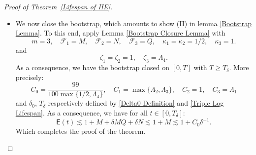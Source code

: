 \documentclass[10pt,a4paper]{amsart}
\begin{document}
\begin{proof}[Proof of Theorem~\ref{Lifespan of IIE}]
\begin{itemize}
\item [(III)] We now close the bootstrap, which amounts to show (II) in lemma \ref{Bootstrap Lemma}. To this end, apply Lemma \ref{Bootstrap Closure Lemma} with
\begin{equation*}
  m=3,\quad\mathcal F_1=M,\quad \mathcal F_2=N,\quad \mathcal F_3=Q,\quad \kappa_1=\kappa_2=1/2,\quad \kappa_3=1.  
\end{equation*}
and
\begin{equation*}
 \zeta_1=\zeta_2=1,\quad \zeta_3=   \Lambda_4.
\end{equation*}
As a consequence, we have the bootstrap closed on $[0,T]$ with $T\ge T_\delta$. More precisely:
\begin{equation*}
C_0=\frac{99}{100\max\{1/2,\Lambda_4\}},\quad C_1=\max\{\Lambda_2,\Lambda_3\},\quad C_2=1,\quad C_3=\Lambda_1    
\end{equation*}
and $\delta_0$, $T_\delta$ respectively defined by \eqref{Delta0 Definition} and \eqref{Triple Log Lifespan}. As a consequence, we have for all $t\in [0,T_\delta]$:
\begin{equation*}
  \mathsf E(t)\lesssim 1+M+\delta MQ +\delta N\lesssim 1+M\lesssim 1+C_0\delta^{-1}. 
\end{equation*}
Which completes the proof of the theorem.

\end{itemize}

\end{proof}
\end{document}
